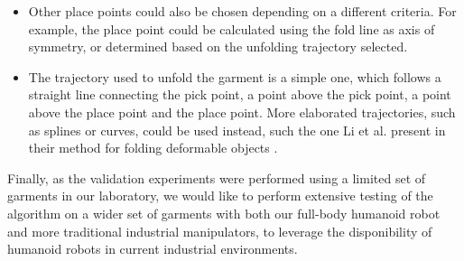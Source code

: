 \begin{enumerate}
\begin{itemize}
\item Other place points could also be chosen depending on a different criteria. For example, the place point could be calculated using the fold line as axis of symmetry, or determined based on the unfolding trajectory selected.	

\item The trajectory used to unfold the garment is a simple one, which follows a straight line connecting the pick point, a point above the pick point, a point above the place point and the place point. More elaborated trajectories, such as splines or curves, could be used instead, such the one Li et al. present in their method for folding deformable objects \cite{Li2015IROS}.

\end{itemize}
\end{enumerate}

Finally, as the validation experiments were performed using a limited set of garments in our laboratory, we would like to perform extensive testing of the algorithm on a wider set of garments with both our full-body humanoid robot and more traditional industrial manipulators, to leverage the disponibility of humanoid robots in current industrial environments.
